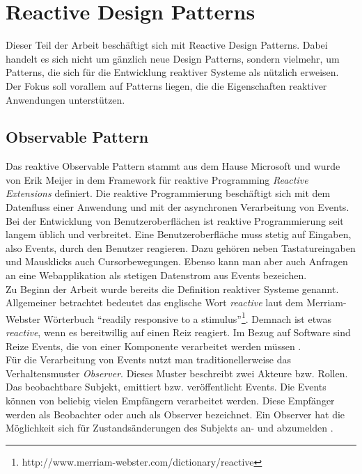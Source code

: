 \section{Reactive Design Patterns}

Dieser Teil der Arbeit beschäftigt sich mit Reactive Design Patterns. Dabei handelt es sich nicht um gänzlich neue Design Patterns, sondern vielmehr, um Patterns, die sich für die Entwicklung reaktiver Systeme als nützlich erweisen. Der Fokus soll vorallem auf Patterns liegen, die die Eigenschaften reaktiver Anwendungen unterstützen.

\subsection{Observable Pattern}
Das reaktive Observable Pattern stammt aus dem Hause Microsoft und wurde von Erik Meijer in dem Framework für reaktive Programming \textit{Reactive Extensions} definiert. Die reaktive Programmierung beschäftigt sich mit dem Datenfluss einer Anwendung und mit der asynchronen Verarbeitung von Events. Bei der Entwicklung von Benutzeroberflächen ist reaktive Programmierung seit langem üblich und verbreitet. Eine Benutzeroberfläche muss stetig auf Eingaben, also Events, durch den Benutzer reagieren. Dazu gehören neben Tastatureingaben und Mausklicks auch Cursorbewegungen. Ebenso kann man aber auch Anfragen an eine Webapplikation als stetigen Datenstrom aus Events bezeichen.\\
Zu Beginn der Arbeit wurde bereits die Definition reaktiver Systeme genannt. Allgemeiner betrachtet bedeutet das englische Wort \textit{reactive} laut dem Merriam-Webster Wörterbuch \enquote{readily responsive to a stimulus}\footnote{http://www.merriam-webster.com/dictionary/reactive}. Demnach ist etwas \textit{reactive}, wenn es bereitwillig auf einen Reiz reagiert. Im Bezug auf Software sind Reize Events, die von einer Komponente verarbeitet werden müssen \cite{rappl_introduction_2016} \cite[S.~4]{carkci_dataflow_2014} \cite[S.~5]{blackheath_functional_2015}.\\
Für die Verarbeitung von Events nutzt man traditionellerweise das Verhaltensmuster \textit{Observer}. Dieses Muster beschreibt zwei Akteure bzw. Rollen. Das beobachtbare Subjekt, emittiert bzw. veröffentlicht Events. Die Events können von beliebig vielen Empfängern verarbeitet werden. Diese Empfänger werden als Beobachter oder auch als Observer bezeichnet. Ein Observer hat die Möglichkeit sich für Zustandsänderungen des Subjekts an- und abzumelden \cite[S.~293]{gamma_design_1995}.\\
